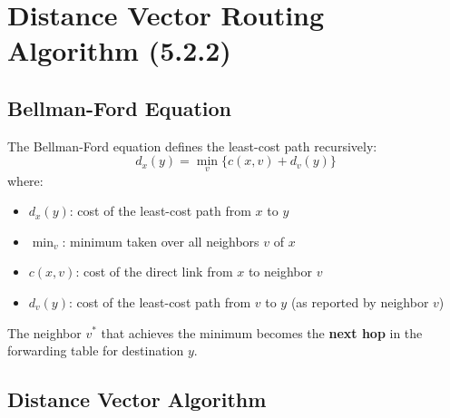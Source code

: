 \section{Distance Vector Routing Algorithm (5.2.2)}

\subsection{Bellman-Ford Equation}

\begin{formulabox}
The Bellman-Ford equation defines the least-cost path recursively:
\[
d_x(y) = \min_v \big\{ c(x,v) + d_v(y) \big\}
\]
where:
\begin{itemize}[noitemsep]
    \item $d_x(y)$: cost of the least-cost path from $x$ to $y$
    \item $\min_v$: minimum taken over all neighbors $v$ of $x$
    \item $c(x,v)$: cost of the direct link from $x$ to neighbor $v$
    \item $d_v(y)$: cost of the least-cost path from $v$ to $y$ (as reported by neighbor $v$)
\end{itemize}

The neighbor $v^*$ that achieves the minimum becomes the \textbf{next hop} in the forwarding table for destination $y$.
\end{formulabox}

\subsection{Distance Vector Algorithm}


